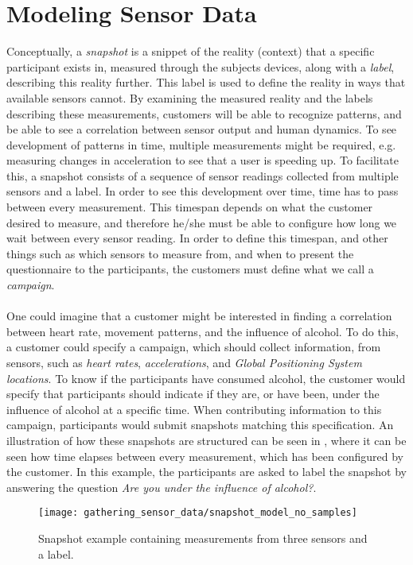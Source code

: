 
\section{Modeling Sensor Data}
\label{sec:modeling_sensor_data}

Conceptually, a \emph{snapshot} is a snippet of the reality (context) that a specific participant exists in, measured through the subjects devices, along with a \emph{label}, describing this reality further. This label is used to define the reality in ways that available sensors cannot. By examining the measured reality and the labels describing these measurements, customers will be able to recognize patterns, and be able to see a correlation between sensor output and human dynamics. To see development of patterns in time, multiple measurements might be required, e.g. measuring changes in acceleration to see that a user is speeding up. To facilitate this, a snapshot consists of a sequence of sensor readings collected from multiple sensors and a label. In order to see this development over time, time has to pass between every measurement. This timespan depends on what the customer desired to measure, and therefore he/she must be able to configure how long we wait between every sensor reading. In order to define this timespan, and other things such as which sensors to measure from, and when to present the questionnaire to the participants, the customers must define what we call a \emph{campaign}.
\\\\
One could imagine that a customer might be interested in finding a correlation between heart rate, movement patterns, and the influence of alcohol. To do this, a customer could specify a campaign, which should collect information, from sensors, such as \emph{heart rates}, \emph{accelerations}, and \emph{Global Positioning System locations}. To know if the participants have consumed alcohol, the customer would specify that participants should indicate if they are, or have been, under the influence of alcohol at a specific time. When contributing information to this campaign, participants would submit snapshots matching this specification. An illustration of how these snapshots are structured can be seen in , where it can be seen how time elapses between every measurement, which has been configured by the customer. In this example, the participants are asked to label the snapshot by answering the question \emph{Are you under the influence of alcohol?}.
\\
\begin{figure}[!htbp]
    \centering
    \texttt{[image: gathering\_sensor\_data/snapshot\_model\_no\_samples]}
    \caption{Snapshot example containing measurements from three sensors and a label.}
    \label{fig:snapshot_model_no_samples}
\end{figure}
\FloatBarrier

